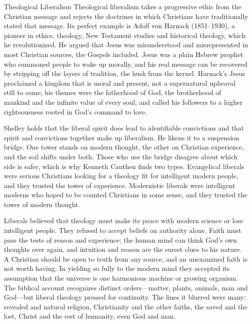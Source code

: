 \begin{sidebox}{Theological Liberalism}
Theological liberalism takes a progressive ethic from the Christian message and rejects the doctrines in which Christians have traditionally stated that message. Its perfect example is Adolf von
Harnack (1851--1930), a pioneer in ethics, theology, New Testament studies and historical theology,
which he revolutionized. He argued that Jesus was misunderstood and misrepresented in most Christian
sources, the Gospels included. Jesus was a plain Hebrew prophet who summoned people to wake up morally,
and his real message can be recovered by stripping off the layers of tradition, the husk from the
kernel. Harnack's Jesus proclaimed a kingdom that is moral and present, not a supernatural upheaval still to come; his themes were the fatherhood of God, the brotherhood of mankind and
the infinite value of every soul, and called his followers to a higher righteousness rooted in God's
command to love.
\end{sidebox}

Shelley holds that the liberal spirit does lead to identifiable convictions and that spirit and
convictions together make up liberalism. He likens it to a suspension bridge. One tower stands on
modern thought, the other on Christian experience, and the soil shifts under both. Those who use the
bridge disagree about which side is safer, which is why Kenneth Cauthen finds two types. Evangelical
liberals were serious Christians looking for a theology fit for intelligent modern people, and
they trusted the tower of experience. Modernistic liberals were intelligent moderns who hoped to be
counted Christians in some sense, and they trusted the tower of modern thought.

Liberals believed that theology must make its peace with modern science or lose intelligent people. They refused to accept beliefs on authority alone. Faith must pass the tests of
reason and experience; the human mind can think God's own thoughts over again, and intuition and reason are the surest clues to his nature. A Christian should be open to truth from any source, and an
unexamined faith is not worth having. In yielding so fully to the modern mind they accepted its
assumption that the universe is one harmonious machine or growing organism. The biblical account
recognizes distinct orders---matter, plants, animals, man and God---but liberal theology pressed
for continuity. The lines it blurred were many: revealed and natural religion, Christianity and the other faiths, the saved and the lost, Christ and the rest of humanity, even God and man.


